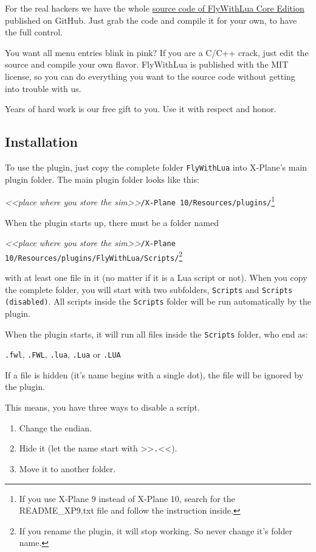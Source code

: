 \documentclass[11pt,parskip=half,a4paper]{scrartcl}
\begin{document}
For the real hackers we have the whole \href{https://github.com/X-Friese/FlyWithLua}{source code of FlyWithLua Core Edition} published on GitHub. Just grab the code and compile it for your own, to have the full control.

You want all menu entries blink in pink? If you are a C/C++ crack, just edit the source and compile your own flavor. FlyWithLua is published with the MIT license, so you can do everything you want to the source code without getting into trouble with us.

Years of hard work is our free gift to you. Use it with respect and honor.

\newpage
\subsection{Installation}

To use the plugin, just copy the complete folder \verb|FlyWithLua| into X-Plane's main plugin folder. The main plugin folder looks like this:

\emph{<<place where you store the sim>>}\verb|/X-Plane 10/Resources/plugins/|\footnote{If you use X-Plane 9 instead of X-Plane 10, search for the README\_XP9.txt file and follow the instruction inside.}

When the plugin starts up, there must be a folder named

\emph{<<place where you store the sim>>}\verb|/X-Plane 10/Resources/plugins/FlyWithLua/Scripts/|\footnote{If you rename the plugin, it will stop working. So never change it's folder name.}

with at least one file in it (no matter if it is a Lua script or not). When you copy the complete folder, you will start with two subfolders, \verb|Scripts| and \verb|Scripts (disabled)|. All scripts inside the \verb|Scripts| folder will be run automatically by the plugin.

When the plugin starts, it will run all files inside the \verb|Scripts| folder, who end as:

\verb|.fwl|, \verb|.FWL|, \verb|.lua|, \verb|.Lua| or \verb|.LUA|

If a file is hidden (it's name begins with a single dot), the file will be ignored by the plugin.

This means, you have three ways to disable a script.

\begin{enumerate}
\item Change the endian.
\item Hide it (let the name start with >>\verb|.|<<).
\item Move it to another folder.
\end{enumerate}
\end{document}

